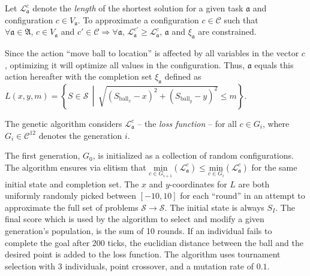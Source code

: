Let \(\mathscr{L}^c_\mathfrak{a}\) denote the \textit{length} of the shortest solution for a given task \(\mathfrak{a}\) and configuration \(c\in V_\mathfrak{a}\). To approximate a configuration \(c\in\mathcal{C}\) such that \( \forall \mathfrak{a}\in\mathfrak{A},\, c\in V_\mathfrak{a} \) and \(c'\in\mathcal{C} \Rightarrow \forall \mathfrak{a},\, \mathscr{L}^{c'}_\mathfrak{a} \ge \mathscr{L}^{c}_\mathfrak{a}\), \(\mathfrak{a}\) and \(\xi_\mathfrak{a}\) are constrained.

Since the action ``move ball to location'' is affected by all variables in the vector \(c\), optimizing it will optimize all values in the configuration. Thus, \(\mathfrak{a}\) equals this action hereafter with the completion set \(\xi_\mathfrak{a}\) defined as \(L(x,y,m) = \left\{ S \in \mathcal{S} \,\middle|\, \sqrt{ \left(S_{\text{ball}_x} - x\right)^2 + \left(S_{\text{ball}_y} - y\right)^2 } \le m \right\}\).

The genetic algorithm considers \(\mathscr{L}^{c}_\mathfrak{a}\) -- the \textit{loss function} -- for all \(c\in G_i\), where \(G_i\in\mathcal{C}^{12}\) denotes the generation \(i\).

The first generation, \(G_0\), is initialized as a collection of random configurations. The algorithm ensures via elitism that \(\underset{c\in G_{i+1}}{\text{min}}\left( \mathscr{L}^{c}_\mathfrak{a} \right) \le \underset{c\in G_{i}}{\text{min}}\left( \mathscr{L}^{c}_\mathfrak{a} \right)\) for the same initial state and completion set. The \(x\) and \(y\)-coordinates for \(L\) are both uniformly randomly picked between \([-10,10]\) for each ``round'' in an attempt to approximate the full set of problems \(\mathcal{S}\to\mathcal{S}\). The initial state is always \(S_I\). The final score which is used by the algorithm to select and modify a given generation's population, is the sum of 10 rounds. If an individual fails to complete the goal after 200 ticks, the euclidian distance between the ball and the desired point is added to the loss function. The algorithm uses tournament selection with 3 individuals, point crossover, and a mutation rate of \(0.1\).
